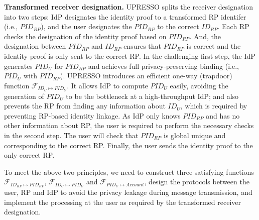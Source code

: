 \vspace{1mm}\noindent \textbf{Transformed receiver designation.}
UPRESSO splits the receiver designation into two steps: IdP designates the identity proof to a transformed RP identifer (i.e., $PID_{RP}$), and the user designates the $PID_{RP}$ to the correct $ID_{RP}$.
 Each RP checks the  designation of the identity proof based on $PID_{RP}$.
And, the designation between $PID_{RP}$ and $ID_{RP}$ ensures that $PID_{RP}$ is correct and the identity proof is only sent to the correct RP.
In the challenging first step, the IdP generates $PID_U$ for $PID_{RP}$ and achieves full privacy-preserving binding (i.e., $PID_U$ with $PID_{RP}$).
UPRESSO introduces an efficient one-way (trapdoor) function $\mathcal{F}_{ID_{U} \mapsto PID_{U}}$.
 It allows IdP to  compute $PID_U$ easily,  avoiding the generation of $PID_U$ to be the bottleneck at a high-throughput IdP;
   and also prevents the RP from finding any information about $ID_U$, which is required by preventing RP-based identity linkage.
As IdP only knows $PID_{RP}$ and has no other information about RP, the user is required to perform the necessary checks  in the second step.
The user will check that $PID_{RP}$ is global unique and corresponding to the correct RP.
Finally, the user sends the identity proof  to the only correct RP.

To meet the above two principles, we need to construct three satisfying functions $\mathcal{F}_{ID_{RP} \mapsto PID_{RP}}$, $\mathcal{F}_{ID_{U} \mapsto PID_{U}}$ and $\mathcal{F}_{PID_{U} \mapsto Account}$, design the protocols between the user, RP and IdP to avoid the privacy leakage during message transmission, and implement the  processing at the user as  required by the transformed receiver designation.









